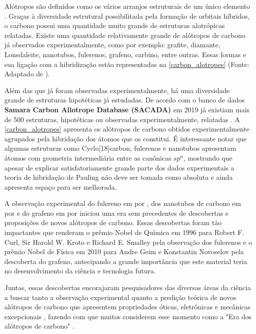 	Alótropos são definidos como os vários arranjos estruturais de um único elemento \cite{mcnaught1997compendium}. Graças à diversidade estrutural possibilitada pela formação de orbitais híbridos, o carbono possui uma quantidade muito grande de estruturas alotrópicas relatadas. Existe uma quantidade relativamente grande de alótropos de carbono já observados experimentalmente, como por exemplo: grafite, diamante, Lonsdaleite, nanotubos, fulerenos, grafeno, carbino, entre outras. Essas formas e sua ligação com a hibridização estão representadas na \autoref{carbon_alotropes} (Fonte: Adaptado de \cite{stauss2017diamondoids}). 
	
	Além das que já foram observadas experimentalmente, há uma diversidade grande de estruturas hipotéticas já estudadas. De acordo com o banco de dados \textbf{Samara Carbon Allotrope Database (SACADA)} em 2019 já existiam mais de 500 estruturas, hipotéticas ou observadas experimentalmente, relatadas \cite{hoffmann2016homo}. A \autoref{carbon_alotropes} apresenta os alótropos de carbono obtidos experimentalmente agrupados pela hibridação dos átomos que os constitui. É interessante notar que algumas estruturas como Cyclo[18]carbon, fulerenos e nanotubos apresentam átomos com geometria intermediária entre as canônicas $sp^n$, mostrando que apesar de explicar satisfatoriamente grande parte dos dados experimentais a teoria de hibridação de Pauling não deve ser tomada como absoluta e ainda apresenta espaço para ser melhorada. 

	A observação experimental do fulereno em \citeyear{kroto1985c60} por \citeauthor{kroto1985c60}, dos nanotubos de carbono em \citeyear{iijima1991helical} por \citeauthor{iijima1991helical} e do grafeno em \citeyear{novoselov2004electric} por \citeauthor{novoselov2004electric} iniciou uma era sem precedentes de descobertas e proposições de novos alótropos de carbono. Essas descobertas foram tão impactantes que renderam o prêmio Nobel de Química em 1996\cite{prato199760} para Robert F. Curl, Sir Harold W. Kroto e Richard E. Smalley pela observação dos fulerenos e o prêmio Nobel de Física em 2010 \cite{gerstner2010nobel} para Andre Geim e Konstantin Novoselov pela descoberta do grafeno, antecipando a grande importância que este material teria no desenvolvimento da ciência e tecnologia futura. 
	
	Juntas, essas descobertas encorajaram pesquisadores das diversas áreas da ciência a buscar tanto a observação experimental quanto a predição teórica de novos alótropos de carbono que apresentem propriedades óticas, eletrônicas e mecânicas excepcionais \cite{taylor1992third}, fazendo com que muitos considerem esse momento como a "Era dos alótropos de carbono" \cite{neto2010carbon, hirsch2010era}.
		
